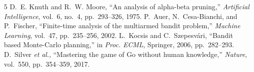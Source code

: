 \documentclass[conference]{IEEEtran}
\begin{document}
\begin{thebibliography}{5}
D.~E. Knuth and R.~W. Moore, ``An analysis of alpha-beta pruning,'' \emph{Artificial Intelligence}, vol.~6, no.~4, pp.~293--326, 1975.
P.~Auer, N.~Cesa-Bianchi, and P.~Fischer, ``Finite-time analysis of the multiarmed bandit problem,'' \emph{Machine Learning}, vol.~47, pp.~235--256, 2002.
L.~Kocsis and C.~Szepesv\'ari, ``Bandit based Monte-Carlo planning,'' in \emph{Proc. ECML}, Springer, 2006, pp.~282--293.
D.~Silver \emph{et al.}, ``Mastering the game of Go without human knowledge,'' \emph{Nature}, vol.~550, pp.~354--359, 2017.
\end{thebibliography}
\end{document}
